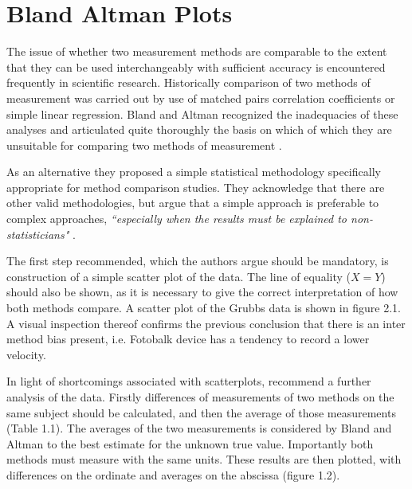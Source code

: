 \documentclass[Chap2main.tex]{subfiles}
\begin{document}
	\section{Bland Altman Plots}
	The issue of whether two measurement methods are comparable to the extent that they can be used interchangeably with sufficient
	accuracy is encountered frequently in scientific research. Historically comparison of two methods of measurement was carried
	out by use of matched pairs correlation coefficients or simple linear regression. Bland and Altman recognized the inadequacies of
	these analyses and articulated quite thoroughly the basis on which of which they are unsuitable for comparing two methods of
	measurement \citep*{BA83}.
	
	As an alternative they proposed a simple statistical methodology specifically appropriate for method comparison studies. They
	acknowledge that there are other valid methodologies, but argue that a simple approach is preferable to complex approaches,
	\emph{``especially when the results must be explained to non-statisticians"} \citep*{BA83}.
	
	The first step recommended, which the authors argue should be mandatory, is construction of a simple scatter plot of the data.
	The line of equality ($X=Y$) should also be shown, as it is necessary to give the correct interpretation of how both methods
	compare. A scatter plot of the Grubbs data is shown in figure 2.1.
	A visual inspection thereof confirms the previous conclusion that there is an inter method bias present, i.e. Fotobalk device has a
	tendency to record a lower velocity.
	
	
	In light of shortcomings associated with scatterplots, \citet*{BA83} recommend a further analysis of the data. Firstly
	differences of measurements of two methods on the same subject should  be calculated, and then the average of those measurements
	(Table 1.1). The averages of the two measurements is considered by Bland and Altman to the best estimate for the unknown true value.
	Importantly both methods must measure with the same units. These  results are then plotted, with differences on the ordinate and
	averages on the abscissa (figure 1.2).
	
\end{document}
